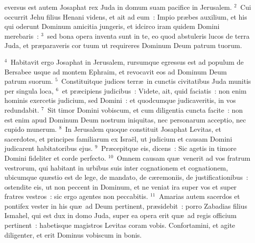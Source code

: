 \bchapter
{}eversus est autem Josaphat rex Juda in domum suam pacifice in Jerusalem.
${}^{2}$~Cui occurrit Jehu filius Henani videns, et ait ad eum~: Impio pr\ae bes auxilium, et his qui oderunt Dominum amicitia jungeris, et idcirco iram quidem Domini merebaris~:
${}^{3}$~sed bona opera inventa sunt in te, eo quod abstuleris lucos de terra Juda, et pr\ae paraveris cor tuum ut requireres Dominum Deum patrum tuorum.


${}^{4}$~Habitavit ergo Josaphat in Jerusalem, rursumque egressus est ad populum de Bersabee usque ad montem Ephraim, et revocavit eos ad Dominum Deum patrum suorum.
${}^{5}$~Constituitque judices terr\ae\ in cunctis civitatibus Juda munitis per singula loca,
${}^{6}$~et pr\ae cipiens judicibus~: Videte, ait, quid faciatis~: non enim hominis exercetis judicium, sed Domini~: et quodcumque judicaveritis, in vos redundabit.
${}^{7}$~Sit timor Domini vobiscum, et cum diligentia cuncta facite~: non est enim apud Dominum Deum nostrum iniquitas, nec personarum acceptio, nec cupido munerum.
${}^{8}$~In Jerusalem quoque constituit Josaphat Levitas, et sacerdotes, et principes familiarum ex Isra\"el, ut judicium et causam Domini judicarent habitatoribus ejus.
${}^{9}$~Pr\ae cepitque eis, dicens~: Sic agetis in timore Domini fideliter et corde perfecto.
${}^{10}$~Omnem causam qu\ae\ venerit ad vos fratrum vestrorum, qui habitant in urbibus suis inter cognationem et cognationem, ubicumque qu\ae stio est de lege, de mandato, de c\ae remoniis, de justificationibus~: ostendite eis, ut non peccent in Dominum, et ne veniat ira super vos et super fratres vestros~: sic ergo agentes non peccabitis.
${}^{11}$~Amarias autem sacerdos et pontifex vester in his qu\ae\ ad Deum pertinent, pr\ae sidebit~: porro Zabadias filius Ismahel, qui est dux in domo Juda, super ea opera erit qu\ae\ ad regis officium pertinent~: habetisque magistros Levitas coram vobis. Confortamini, et agite diligenter, et erit Dominus vobiscum in bonis.


